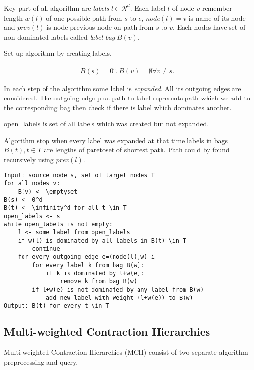 Key part of all algorithm are \emph{labels} $l\in \mathcal{R}^d$.
Each label $l$ of node $v$ remember length $w(l)$  of one 
possible path from $s$ to $v$, $node(l) = v$ is name of its node
and $prev(l)$ is node previous node on path from $s$ to $v$.
Each nodes have set of non-dominated labels called \emph{label bag} $B(v)$.

Set up algorithm by creating labels.

\begin{gather*} 
B(s)=0^d, B(v)=\emptyset \forall v \ne s.
\end{gather*} 

In each step of the algorithm some label is \emph{expanded}. 
All its outgoing edges are considered. 
The outgoing edge plus path to label represents 
path which we add to the corresponding bag then check if there
is label which dominates another.

open\_labels is set of all labels which was created but not expanded.

Algorithm stop when every label was expanded at that time
labels in bags $B(t), t \in T$ are lengths of paretoset of shortest path.
Path could by found recursively using $prev(l)$.


\begin{lstlisting}[caption={Meta Search Algorithm},label=list:8-6,captionpos=t,float,abovecaptionskip=-\medskipamount]
Input: source node s, set of target nodes T
for all nodes v:
	B(v) <- \emptyset
B(s) <- 0^d
B(t) <- \infinity^d for all t \in T
open_labels <- s
while open_labels is not empty:
	l <- some label from open_labels
    if w(l) is dominated by all labels in B(t) \in T
    	continue
    for every outgoing edge e=(node(l),w)_i
    	for every label k from bag B(w):
        	if k is dominated by l+w(e):
            	remove k from bag B(w)
        if l+w(e) is not dominated by any label from B(w)
        	add new label with weight (l+w(e)) to B(w)
Output: B(t) for every t \in T
\end{lstlisting}



\subsection{Multi-weighted Contraction Hierarchies}
Multi-weighted Contraction Hierarchies (MCH) consist of two separate algorithm
preprocessing and query.

